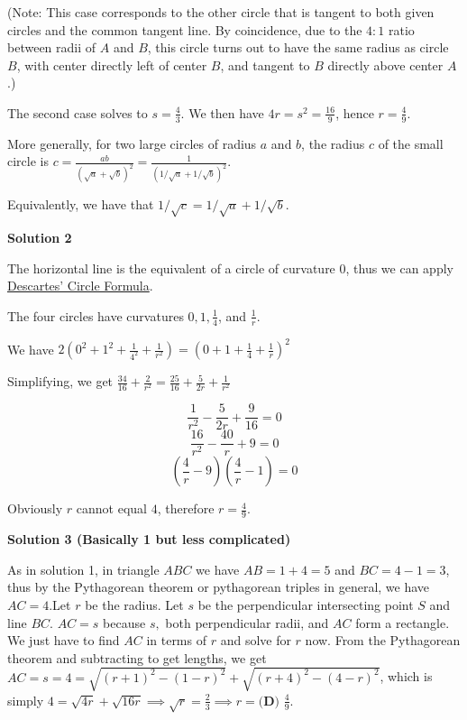 \begin{enumerate}
 (Note: This case corresponds to the other circle that is tangent to both given circles and the common tangent line. By coincidence, due to the $4:1$ ratio between radii of $A$ and $B$, this circle turns out to have the same radius as circle $B$, with center directly left of center $B$, and tangent to $B$ directly above center $A$.) 

 The second case solves to $s=\frac 43$. We then have $4r = s^2 = \frac {16}9$, hence $r = \boxed{\frac 49}$.

 
More generally, for two large circles of radius $a$ and $b$, the radius $c$ of the small circle is $c = \frac{ab}{\left(\sqrt{a}+\sqrt{b}\right)^2} = \frac{1}{\left(1/\sqrt{a}+1/\sqrt{b}\right)^2}$. 

 Equivalently, we have that $1/\sqrt{c} = 1/\sqrt{a} + 1/\sqrt{b}$.

 



\textbf{Solution 2}

The horizontal line is the equivalent of a circle of curvature $0$, thus we can apply \href{https://artofproblemsolving.com/wiki/index.php?title=Descartes\%27\_Circle\_Formula}{Descartes' Circle Formula}.

 The four circles have curvatures $0, 1, \frac 14$, and $\frac 1r$.

 We have $2\left(0^2+1^2+\frac {1}{4^2}+\frac{1}{r^2}\right)=\left(0+1+\frac 14+\frac 1r\right)^2$

 Simplifying, we get $\frac{34}{16}+\frac{2}{r^2}=\frac{25}{16}+\frac{5}{2r}+\frac{1}{r^2}$

 \[\frac{1}{r^2}-\frac{5}{2r}+\frac{9}{16}=0\]
 \[\frac{16}{r^2}-\frac{40}{r}+9=0\]
 \[\left(\frac{4}{r}-9\right)\left(\frac{4}{r}-1\right)=0\]

 Obviously $r$ cannot equal $4$, therefore $r = \boxed{\frac 49}$.

 



\textbf{Solution 3 (Basically 1 but less complicated)}

As in solution 1, in triangle $ABC$ we have $AB = 1+4 = 5$ and $BC=4-1 = 3$, thus by the Pythagorean theorem or pythagorean triples in general, we have $AC=4$.Let $r$ be the radius. Let $s$ be the perpendicular intersecting point $S$ and line $BC$. $AC=s$ because $s,$ both perpendicular radii, and $AC$ form a rectangle. We just have to find $AC$ in terms of $r$ and solve for $r$ now. From the Pythagorean theorem and subtracting to get lengths, we get $AC=s=4=\sqrt{(r+1)^2 - (1-r)^2} + \sqrt{(r+4)^2 - (4-r)^2}$, which is simply $4=\sqrt{4r}+\sqrt{16r} \implies \sqrt{r}=\frac{2}{3} \implies r= \boxed{\textbf{(D) } \frac{4}{9}}.$




\end{enumerate}
